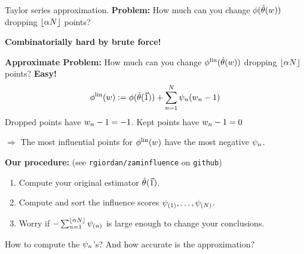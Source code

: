 \begin{frame}{Taylor series approximation.}
%
\textbf{Problem: }
%
How much can you change $\phi(\hat{\theta}(w))$
dropping $\lfloor \alpha N \rfloor$ points?

\textbf{Combinatorially hard by brute force!}

\hrulefill

\pause
\textbf{Approximate Problem: }
%
How much can you change $\phi^{\mathrm{lin}}(\hat{\theta}(w))$
dropping $\lfloor \alpha N \rfloor$ points?
%
\textbf{Easy! }
%
\begin{align*}
    \phi^{\mathrm{lin}}(w)
		:=  \phi(\hat{\theta}(\vec{1})) +
        \sum_{n=1}^N \psi_n (w_n -1)
\end{align*}
%
Dropped points have $w_n - 1 = -1$.  Kept points have $w_n - 1 = 0$

$\Rightarrow$ The most influential points for $\phi^{\mathrm{lin}}(w)$ have the
most negative $\psi_n$.

\hrulefill

\pause
\textbf{Our procedure:}  (see \texttt{rgiordan/zaminfluence} on \texttt{github})
\begin{enumerate}
    \item Compute your original estimator $\hat{\theta}(\vec{1})$.
    \item Compute and sort the influence scores
        $\psi_{(1)}, \ldots, \psi_{(N)}$.
    \item Worry if $- \sum_{n=1}^{\lfloor \alpha N \rfloor} \psi_{(n)}$ is large
    enough to change your conclusions.
\end{enumerate}

\pause
How to compute the $\psi_n$'s?  And how accurate is the approximation?

\end{frame}


